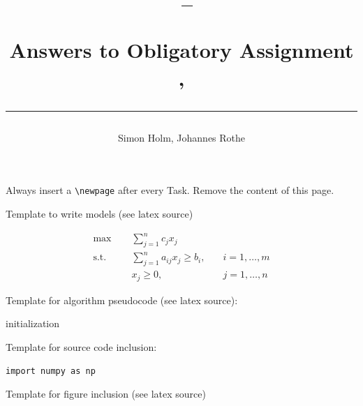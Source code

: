 \documentclass[a4paper,11pt]{article}
\author{Simon Holm, Johannes Rothe}
\title{\begin{flushleft}
\vspace{-4ex}
\courseid~-- \coursename \\[0.2cm]
{\Large Answers to Obligatory Assignment \assnr, \term \\[3ex]
\hrule}
\end{flushleft}
}
\date{}
\begin{document}
\maketitle
\setlength{\headheight}{26pt}


Always insert a \verb=\newpage= after every Task.
Remove the content of this page.

\bigskip
\bigskip

Template to write models (see latex source)

\begin{align}
   \label{ob} \max \; \quad & \sum_{j=1}^nc_jx_j  \\
   \label{c1} \mbox{s.t.} \quad &\sum\limits_{j=1}^n a_{ij}x_j\geq b_i,
   & \quad i=1,\ldots,m \\
\label{c2}   &x_j \geq 0, & \quad j=1,\ldots,n   
\end{align}

Template for algorithm pseudocode (see latex source):

\begin{algorithm}[htb]
 initialization\;
 \caption{How to write algorithms}
\end{algorithm}


\bigskip
\bigskip
Template for source code inclusion:

\begin{lstlisting}
import numpy as np

\end{lstlisting}

Template for figure inclusion (see latex source)

\begin{figure}[htb]
\begin{center}
\end{center}
\end{figure}
\end{document}
